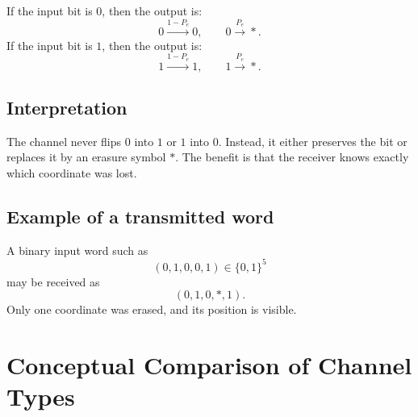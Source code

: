 \documentclass[11pt]{article}
\begin{document}
If the input bit is $0$, then the output is:
\[
0 \xrightarrow{1-P_e} 0, \qquad 0 \xrightarrow{P_e} \ast.
\]
If the input bit is $1$, then the output is:
\[
1 \xrightarrow{1-P_e} 1, \qquad 1 \xrightarrow{P_e} \ast.
\]

\begin{center}
\end{center}

\subsection{Interpretation}

The channel never flips $0$ into $1$ or $1$ into $0$. Instead, it either preserves the bit
or replaces it by an erasure symbol $\ast$. The benefit is that the receiver knows exactly
which coordinate was lost.

\subsection{Example of a transmitted word}

A binary input word such as
\[
(0,1,0,0,1) \in \{0,1\}^5
\]
may be received as
\[
(0,1,0,\ast,1).
\]
Only one coordinate was erased, and its position is visible.

\section{Conceptual Comparison of Channel Types}
\end{document}
